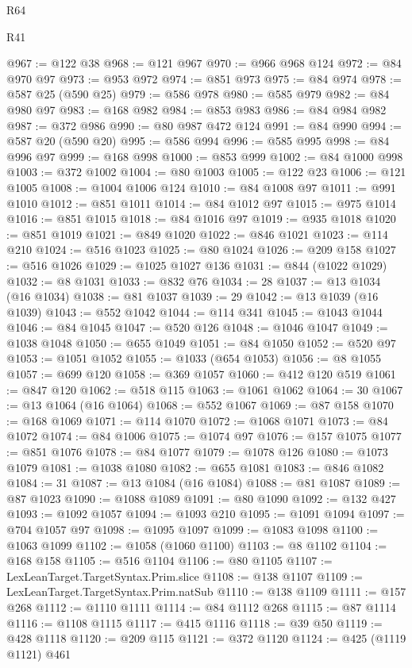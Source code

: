 \begin{lexlean}{R64}
\begin{lexlean}{R41}
\begin{coremodule}
{{{{{{{{{{{{{{{{{{{{{{{{{{{{{{{{{{{{{{{{{{{{{{{{{{{{{{{{{{{{{{{{{{{{{{{{{{{{{{{{{{{{{{{{{@967 := @122 @38
@968 := @121 @967
@970 := @966 @968 @124
@972 := @84 @970 @97
@973 := @953 @972
@974 := @851 @973
@975 := @84 @974
@978 := @587 @25 (@590 @25)
@979 := @586 @978
@980 := @585 @979
@982 := @84 @980 @97
@983 := @168 @982
@984 := @853 @983
@986 := @84 @984 @982
@987 := @372 @986
@990 := @80 @987 @472 @124
@991 := @84 @990
@994 := @587 @20 (@590 @20)
@995 := @586 @994
@996 := @585 @995
@998 := @84 @996 @97
@999 := @168 @998
@1000 := @853 @999
@1002 := @84 @1000 @998
@1003 := @372 @1002
@1004 := @80 @1003
@1005 := @122 @23
@1006 := @121 @1005
@1008 := @1004 @1006 @124
@1010 := @84 @1008 @97
@1011 := @991 @1010
@1012 := @851 @1011
@1014 := @84 @1012 @97
@1015 := @975 @1014
@1016 := @851 @1015
@1018 := @84 @1016 @97
@1019 := @935 @1018
@1020 := @851 @1019
@1021 := @849 @1020
@1022 := @846 @1021
@1023 := @114 @210
@1024 := @516 @1023
@1025 := @80 @1024
@1026 := @209 @158
@1027 := @516 @1026
@1029 := @1025 @1027 @136
@1031 := @844 (@1022 @1029)
@1032 := @8 @1031
@1033 := @832 @76
@1034 := 28
@1037 := @13 @1034 (@16 @1034)
@1038 := @81 @1037
@1039 := 29
@1042 := @13 @1039 (@16 @1039)
@1043 := @552 @1042
@1044 := @114 @341
@1045 := @1043 @1044
@1046 := @84 @1045
@1047 := @520 @126
@1048 := @1046 @1047
@1049 := @1038 @1048
@1050 := @655 @1049
@1051 := @84 @1050
@1052 := @520 @97
@1053 := @1051 @1052
@1055 := @1033 (@654 @1053)
@1056 := @8 @1055
@1057 := @699 @120
@1058 := @369 @1057
@1060 := @412 @120 @519
@1061 := @847 @120
@1062 := @518 @115
@1063 := @1061 @1062
@1064 := 30
@1067 := @13 @1064 (@16 @1064)
@1068 := @552 @1067
@1069 := @87 @158
@1070 := @168 @1069
@1071 := @114 @1070
@1072 := @1068 @1071
@1073 := @84 @1072
@1074 := @84 @1006
@1075 := @1074 @97
@1076 := @157 @1075
@1077 := @851 @1076
@1078 := @84 @1077
@1079 := @1078 @126
@1080 := @1073 @1079
@1081 := @1038 @1080
@1082 := @655 @1081
@1083 := @846 @1082
@1084 := 31
@1087 := @13 @1084 (@16 @1084)
@1088 := @81 @1087
@1089 := @87 @1023
@1090 := @1088 @1089
@1091 := @80 @1090
@1092 := @132 @427
@1093 := @1092 @1057
@1094 := @1093 @210
@1095 := @1091 @1094
@1097 := @704 @1057 @97
@1098 := @1095 @1097
@1099 := @1083 @1098
@1100 := @1063 @1099
@1102 := @1058 (@1060 @1100)
@1103 := @8 @1102
@1104 := @168 @158
@1105 := @516 @1104
@1106 := @80 @1105
@1107 := LexLeanTarget.TargetSyntax.Prim.slice
@1108 := @138 @1107
@1109 := LexLeanTarget.TargetSyntax.Prim.natSub
@1110 := @138 @1109
@1111 := @157 @268
@1112 := @1110 @1111
@1114 := @84 @1112 @268
@1115 := @87 @1114
@1116 := @1108 @1115
@1117 := @415 @1116
@1118 := @39 @50
@1119 := @428 @1118
@1120 := @209 @115
@1121 := @372 @1120
@1124 := @425 (@1119 @1121) @461
}}}}}}}}}}}}}}}}}}}}}}}}}}}}}}}}}}}}}}}}}}}}}}}}}}}}}}}}}}}}}}}}}}}}}}}}}}}}}}}}}}}}}}}}}
\end{coremodule}
\end{lexlean}
\end{lexlean}
